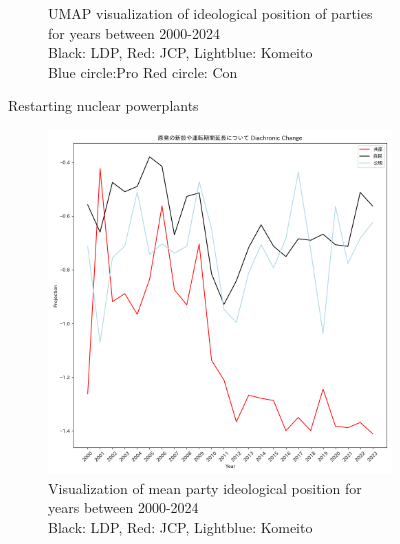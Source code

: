 \documentclass[final,5p,times,twocolumn,authoryear]{elsarticle}
\begin{document}
\begin{figure}[h]
\begin{subfigure}{0.48\textwidth}
		  \caption{UMAP visualization of ideological position of parties for years between 2000-2024 \\\hspace{\textwidth} 
		  Black: LDP, Red: JCP, Lightblue: Komeito\\\hspace{\textwidth}
		  Blue circle:Pro Red circle: Con}
		\end{subfigure}
	\caption{Restarting nuclear powerplants}
	\label{fig: results-diachronic-nuclear-restart}
\end{figure}

\begin{figure}[h]
	\centering
		\begin{subfigure}{0.48\textwidth}
		  \centering
		  \includegraphics[width=\textwidth]{figs/results/diachronic_nuclear/原発の新設や運転期間延長について_原発_diachronic_change.png}
		  \caption{Visualization of mean party ideological position for years between 2000-2024 \\\hspace{\textwidth} Black: LDP, Red: JCP, Lightblue: Komeito}
		  \label{fig:sub1}
		\end{subfigure}
		\hfill
		\begin{subfigure}{0.48\textwidth}
		  \centering

\end{subfigure}
\end{figure}
\end{document}
